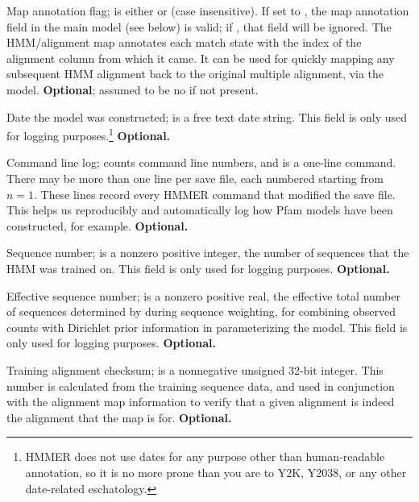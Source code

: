 \begin{sreitems}{}
\item [\monob{MAP <s>}] Map annotation flag;  is either
 or  (case insensitive).  If set to , the
map annotation field in the main model (see below) is valid; if
, that field will be ignored.  The HMM/alignment map
annotates each match state with the index of the alignment column from
which it came. It can be used for quickly mapping any subsequent
HMM alignment back to the original multiple alignment, via the model.
\textbf{Optional}; assumed to be no if not present.

\item [\monob{DATE <s>}] Date the model was constructed; 
is a free text date string.  This field is only used for logging
purposes.\footnote{HMMER does not use dates for any purpose other than
human-readable annotation, so it is no more prone than you are to Y2K,
Y2038, or any other date-related eschatology.} \textbf{Optional.}

\item [\monob{COM [<n>] <s>}] Command line log;  counts
command line numbers, and  is a one-line command. There may
be more than one  line per save file, each numbered starting
from $n=1$. These lines record every HMMER command that modified the
save file. This helps us reproducibly and automatically log how Pfam
models have been constructed, for example. \textbf{Optional.}

\item [\monob{NSEQ  <d>}] Sequence number;  is a nonzero
positive integer, the number of sequences that the HMM was trained on.
This field is only used for logging purposes.
\textbf{Optional.}

\item [\monob{EFFN <f>}] Effective sequence number;  is a
nonzero positive real, the effective total number of sequences
determined by  during sequence weighting, for combining
observed counts with Dirichlet prior information in parameterizing the
model. This field is only used for logging purposes.
\textbf{Optional.}

\item [\monob{CKSUM <d>}] Training alignment checksum;  is
  a nonnegative unsigned 32-bit integer. This number is calculated
  from the training sequence data, and used in conjunction with the
  alignment map information to verify that a given alignment is indeed
  the alignment that the map is for. \textbf{Optional.}


\end{sreitems}
